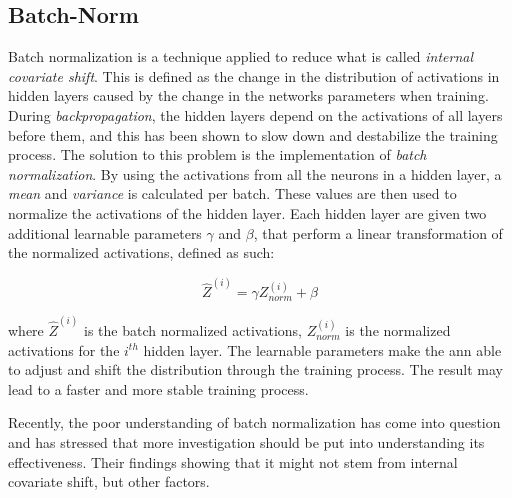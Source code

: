 \subsection{Batch-Norm}
    Batch normalization is a technique applied to reduce what is called \textit{internal  covariate shift}\cite{pmlr-v37-ioffe15_batch_norm}. This is defined as the change in the distribution of activations in hidden layers caused by the change in the networks parameters when training. During \textit{backpropagation}, the hidden layers depend on the activations of all layers before them, and this has been shown to slow down and destabilize the training process. The solution to this problem is the implementation of \textit{batch normalization}. By using the activations from all the neurons in a hidden layer, a \textit{mean} and \textit{variance} is calculated per batch. These values are then used to normalize the activations of the hidden layer. Each hidden layer are given two additional learnable parameters $\gamma$ and $\beta$, that perform a linear transformation of the normalized activations, defined as such:
    
        \begin{equation} \label{batch_normalization}
            \hat{Z}^{(i)} =   \gamma Z^{(i)}_{norm} + \beta
        \end{equation}
    
    where $\hat{Z}^{(i)}$ is the batch normalized activations, $Z^{(i)}_{norm}$ is the normalized activations for the $i^{th}$ hidden layer. The learnable parameters make the \gls{ann} able to adjust and shift the distribution through the training process. The result may lead to a faster and more stable training process. 
    
    Recently, the poor understanding of batch normalization has come into question and \citet{batch_norm_not_work} has stressed that more investigation should be put into understanding its effectiveness. Their findings showing that it might not stem from internal covariate shift, but other factors. 

